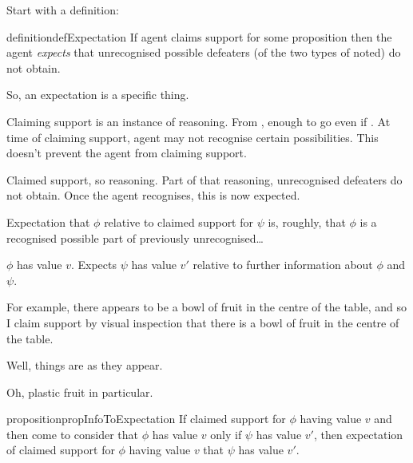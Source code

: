 \begin{note}
  Start with a definition:

  \begin{restatable}{definition}{defExpectation}\label{def:expectation}
    If agent claims support for some proposition then the agent \emph{expects} that unrecognised possible defeaters (of the two types of noted) do not obtain.
  \end{restatable}
  So, an expectation is a specific thing.

  Claiming support is an instance of reasoning.
  From \eiS{}, enough to go even if \mom{}.
  At time of claiming support, agent may not recognise certain possibilities.
  This doesn't prevent the agent from claiming support.

  Claimed support, so reasoning.
  Part of that reasoning, unrecognised defeaters do not obtain.
  Once the agent recognises, this is now expected.

  Expectation that \(\phi\) relative to claimed support for \(\psi\) is, roughly, that \(\phi\) is a recognised possible part of previously unrecognised\dots
\end{note}

\begin{note}
  \(\phi\) has value \(v\).
  Expects \(\psi\) has value \(v'\) relative to further information about \(\phi\) and \(\psi\).
\end{note}

\begin{note}
  For example, there appears to be a bowl of fruit in the centre of the table, and so I claim support by visual inspection that there is a bowl of fruit in the centre of the table.

  Well, things are as they appear.

  Oh, plastic fruit in particular.
\end{note}

\begin{note}
  \begin{restatable}[]{proposition}{propInfoToExpectation}\label{prop:info-to-expectation}
    If claimed support for \(\phi\) having value \(v\) and then come to consider that \(\phi\) has value \(v\) only if \(\psi\) has value \(v'\), then expectation of claimed support for \(\phi\) having value \(v\) that \(\psi\) has value \(v'\).
  \end{restatable}
\end{note}


